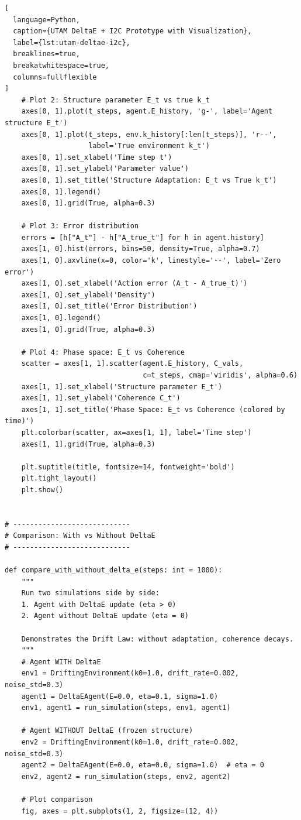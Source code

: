 \documentclass[12pt,a4paper]{report}
\begin{document}
\begin{lstlisting}[
  language=Python,
  caption={UTAM DeltaE + I2C Prototype with Visualization},
  label={lst:utam-deltae-i2c},
  breaklines=true,
  breakatwhitespace=true,
  columns=fullflexible
]
    # Plot 2: Structure parameter E_t vs true k_t
    axes[0, 1].plot(t_steps, agent.E_history, 'g-', label='Agent structure E_t')
    axes[0, 1].plot(t_steps, env.k_history[:len(t_steps)], 'r--', 
                    label='True environment k_t')
    axes[0, 1].set_xlabel('Time step t')
    axes[0, 1].set_ylabel('Parameter value')
    axes[0, 1].set_title('Structure Adaptation: E_t vs True k_t')
    axes[0, 1].legend()
    axes[0, 1].grid(True, alpha=0.3)
    
    # Plot 3: Error distribution
    errors = [h["A_t"] - h["A_true_t"] for h in agent.history]
    axes[1, 0].hist(errors, bins=50, density=True, alpha=0.7)
    axes[1, 0].axvline(x=0, color='k', linestyle='--', label='Zero error')
    axes[1, 0].set_xlabel('Action error (A_t - A_true_t)')
    axes[1, 0].set_ylabel('Density')
    axes[1, 0].set_title('Error Distribution')
    axes[1, 0].legend()
    axes[1, 0].grid(True, alpha=0.3)
    
    # Plot 4: Phase space: E_t vs Coherence
    scatter = axes[1, 1].scatter(agent.E_history, C_vals, 
                                 c=t_steps, cmap='viridis', alpha=0.6)
    axes[1, 1].set_xlabel('Structure parameter E_t')
    axes[1, 1].set_ylabel('Coherence C_t')
    axes[1, 1].set_title('Phase Space: E_t vs Coherence (colored by time)')
    plt.colorbar(scatter, ax=axes[1, 1], label='Time step')
    axes[1, 1].grid(True, alpha=0.3)
    
    plt.suptitle(title, fontsize=14, fontweight='bold')
    plt.tight_layout()
    plt.show()


# ----------------------------
# Comparison: With vs Without DeltaE
# ----------------------------

def compare_with_without_delta_e(steps: int = 1000):
    """
    Run two simulations side by side:
    1. Agent with DeltaE update (eta > 0)
    2. Agent without DeltaE update (eta = 0)
    
    Demonstrates the Drift Law: without adaptation, coherence decays.
    """
    # Agent WITH DeltaE
    env1 = DriftingEnvironment(k0=1.0, drift_rate=0.002, noise_std=0.3)
    agent1 = DeltaEAgent(E=0.0, eta=0.1, sigma=1.0)
    env1, agent1 = run_simulation(steps, env1, agent1)
    
    # Agent WITHOUT DeltaE (frozen structure)
    env2 = DriftingEnvironment(k0=1.0, drift_rate=0.002, noise_std=0.3)
    agent2 = DeltaEAgent(E=0.0, eta=0.0, sigma=1.0)  # eta = 0
    env2, agent2 = run_simulation(steps, env2, agent2)
    
    # Plot comparison
    fig, axes = plt.subplots(1, 2, figsize=(12, 4))
    

\end{lstlisting}
\end{document}
